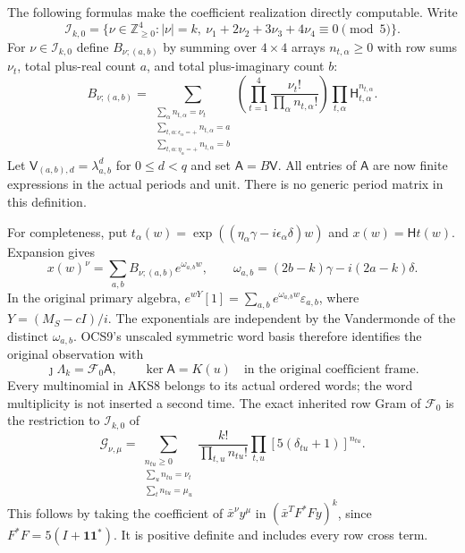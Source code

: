 The following formulas make the coefficient realization directly
computable. Write
\[
 \mathcal I_{k,0}=\{\nu\in\mathbb Z_{\ge0}^4:|\nu|=k,
                         \ \nu_1+2\nu_2+3\nu_3+4\nu_4\equiv0\pmod5\}.
\]
For $\nu\in\mathcal I_{k,0}$ define $B_{\nu;(a,b)}$ by summing over
$4\times4$ arrays $n_{t,\alpha}\ge0$ with row sums $\nu_t$, total plus-real
count $a$, and total plus-imaginary count $b$:
\[
 B_{\nu;(a,b)}=
 \sum_{\substack{\sum_\alpha n_{t,\alpha}=\nu_t\\
       \sum_{t,\alpha:\epsilon_\alpha=+}n_{t,\alpha}=a\\
       \sum_{t,\alpha:\eta_\alpha=+}n_{t,\alpha}=b}}
 \left(\prod_{t=1}^4\frac{\nu_t!}{\prod_\alpha n_{t,\alpha}!}\right)
                  \prod_{t,\alpha}\mathsf H_{t,\alpha}^{n_{t,\alpha}}.
 \tag{AKS8}
\]
Let $\mathsf V_{(a,b),d}=\lambda_{a,b}^d$ for $0\le d<q$ and set
$\mathsf A=B\mathsf V$. All entries of $\mathsf A$ are now finite
expressions in the actual periods and unit. There is no generic period
matrix in this definition.

For completeness, put $t_\alpha(w)=\exp((\eta_\alpha\gamma-
 i\epsilon_\alpha\delta)w)$ and $x(w)=\mathsf Ht(w)$. Expansion gives
\[
 x(w)^\nu=\sum_{a,b}B_{\nu;(a,b)}e^{\omega_{a,b}w},\qquad
 \omega_{a,b}=(2b-k)\gamma-i(2a-k)\delta.
\]
In the original primary algebra,
$e^{wY}[1]=\sum_{a,b}e^{\omega_{a,b}w}\varepsilon_{a,b}$, where
$Y=(M_S-cI)/i$. The exponentials are independent by the Vandermonde of
the distinct $\omega_{a,b}$. OCS9's unscaled symmetric word basis
therefore identifies the original observation with
\[
       \jmath\Lambda_k=\mathcal F_0\mathsf A,
       \qquad\ker\mathsf A=K(u)
       \quad\text{in the original coefficient frame.}
       \tag{AKS9}
\]
Every multinomial in AKS8 belongs to its actual ordered words; the
word multiplicity is not inserted a second time. The exact inherited
row Gram of $\mathcal F_0$ is the restriction to $\mathcal I_{k,0}$ of
\[
 \mathcal G_{\nu,\mu}=
 \sum_{\substack{n_{tu}\ge0\\\sum_u n_{tu}=\nu_t\\
                              \sum_t n_{tu}=\mu_u}}
 \frac{k!}{\prod_{t,u}n_{tu}!}\prod_{t,u}
          [5(\delta_{tu}+1)]^{n_{tu}}.
 \tag{AKS10}
\]
This follows by taking the coefficient of $\bar x^\nu y^\mu$ in
$(\bar x^TF^*Fy)^k$, since $F^*F=5(I+\mathbf1\mathbf1^*)$. It is positive
definite and includes every row cross term.

